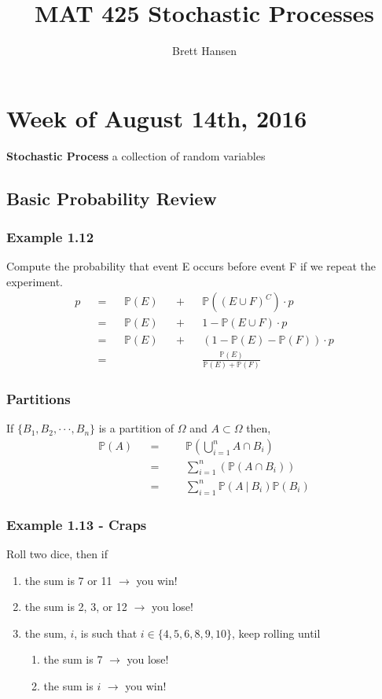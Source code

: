 \documentclass{article}
\title{MAT 425 Stochastic Processes}
\author{Brett Hansen}
\date{}
\newcommand{\ellipse}{\cdot\cdot\cdot}
\newcommand{\ssor}{\ |\ }
\newcommand{\prob}[1]{\mathbb{P}\left(#1\right)}
\newcommand{\conprob}[2]{\prob{#1\ssor#2}}
\begin{document}
\maketitle
\tableofcontents
\break

\section{Week of August 14th, 2016}

\textbf{Stochastic Process} \quad a collection of random variables

\subsection{Basic Probability Review}
\subsubsection{Example 1.12}
Compute the probability that event E occurs before event F if we repeat the experiment.
\begin{align*}
p &&= &&\prob{E} &&+ &&\prob{(E \cup F)^C} \cdot p \\
  &&= &&\prob{E} &&+ &&1 - \prob{E \cup F} \cdot p \\
  &&= &&\prob{E} &&+ &&(1 - \prob{E} - \prob{F}) \cdot p \\
  &&= &&&&&&\frac{\prob{E}}{\prob{E} + \prob{F}}
\end{align*}

\subsubsection{Partitions}
If $\{B_1, B_2, \ellipse, B_n\}$ is a partition of $\Omega$ and $A \subset \Omega$ then,
\begin{align*}
\prob{A} 	&&= &&&\prob{\bigcup_{i=1}^n A \cap B_i} \\
			&&= &&&\sum_{i=1}^n \left(\prob{A \cap B_i}\right) \\
			&&= &&&\sum_{i=1}^n \conprob{A}{B_i}\prob{B_i}
\end{align*}

\subsubsection{Example 1.13 - Craps}
Roll two dice, then if
\begin{enumerate}
	\item the sum is 7 or 11 $\longrightarrow$ you win!
	\item the sum is 2, 3, or 12 $\longrightarrow$ you lose!
	\item the sum, $i$, is such that $i \in \{4, 5, 6, 8, 9, 10\}$, keep rolling until
	\begin{enumerate}
		\item the sum is 7 $\longrightarrow$ you lose!
		\item the sum is $i$ $\longrightarrow$ you win!
	\end{enumerate}
\end{enumerate}
\end{document}

